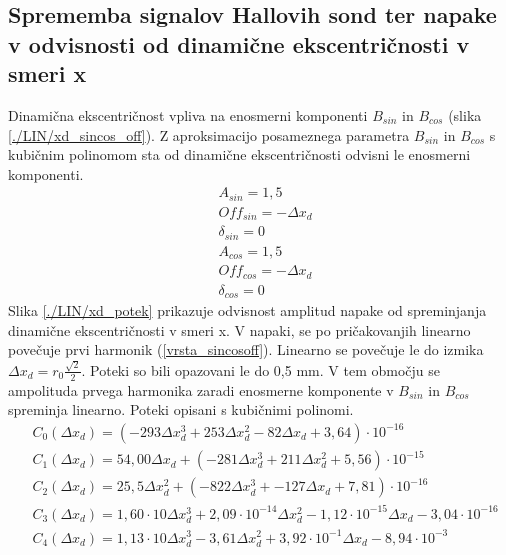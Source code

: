 \subsection{Sprememba signalov Hallovih sond ter napake v odvisnosti od dinamične ekscentričnosti v smeri x}
Dinamična ekscentričnost vpliva na enosmerni komponenti $B_{sin}$ in $B_{cos}$ (slika \ref{./LIN/xd_sincos_off}).
Z aproksimacijo posameznega parametra $B_{sin}$ in $B_{cos}$ s kubičnim polinomom sta od dinamične ekscentričnosti odvisni le enosmerni komponenti.
\begin{eqnarray}
\label{analog_lin_xd}
&A_{sin} = 1,5\\
&Off_{sin} = -\Delta x_d \\
&\delta_{sin} =0 \\
&A_{cos} = 1,5\\
&Off_{cos} = -\Delta x_d\\
&\delta_{cos} = 0
\end{eqnarray}
Slika \ref{./LIN/xd_potek} prikazuje odvisnost amplitud napake od spreminjanja dinamične ekscentričnosti v smeri x. V napaki, se po pričakovanjih linearno povečuje prvi harmonik (\ref{vrsta_sincosoff}). Linearno se povečuje le do izmika $\Delta x_d = r_0 \frac{\sqrt{2}}{2}$. Poteki so bili opazovani le do 0,5 mm. V tem območju se ampolituda prvega harmonika zaradi enosmerne komponente v $B_{sin}$ in $B_{cos}$ spreminja linearno.
Poteki opisani s kubičnimi polinomi.
\begin{eqnarray}
\label{nap_lin_xd}
&C_0(\Delta x_d) =(-293\Delta x_d^{3}+253\Delta x_d^{2}-82\Delta x_d+3,64) \cdot 10^{-16}  \\
&C_1(\Delta x_d) = 54,00\Delta x_d+(-281\Delta x_d^{3}+211\Delta x_d^{2}+5,56) \cdot 10^{-15} \\      
&C_2(\Delta x_d) =25,5\Delta x_d^{2}+ (-822\Delta x_d^{3}+-127\Delta x_d+7,81)\cdot 10^{-16} \\      
&C_3(\Delta x_d) =1,60\cdot 10\Delta x_d^{3}+2,09\cdot 10^{-14}\Delta x_d^{2}-1,12\cdot 10^{-15}\Delta x_d-3,04\cdot 10^{-16} \\       
&C_4(\Delta x_d) =1,13\cdot 10\Delta x_d^{3}-3,61\Delta x_d^{2}+3,92\cdot 10^{-1}\Delta x_d-8,94\cdot 10^{-3}
\end{eqnarray}
